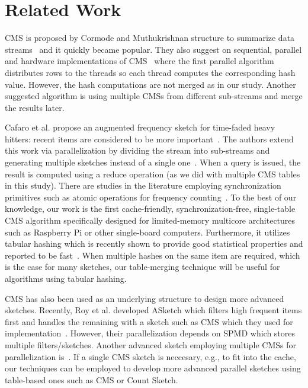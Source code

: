 \documentclass[10pt, conference, compsocconf]{IEEEtran}
\begin{document}
\section{Related Work}\label{sec:related}

CMS is proposed by Cormode and Muthukrishnan structure to summarize data streams~\cite{cormode2005} and it quickly became popular. They also suggest on sequential, parallel and hardware implementations of CMS~\cite{cormode2012} where the first parallel algorithm distributes rows to the threads so each thread computes the corresponding hash value. However, the hash computations are not merged as in our study. Another suggested algorithm is using multiple CMSs from different sub-streams and merge the results later.

Cafaro et al. propose an augmented frequency sketch for time-faded heavy hitters: recent items are considered to be more important~\cite{cafaro2016}. The authors extend this work via parallelization by dividing the stream into sub-streams and generating multiple sketches instead of a single one~\cite{cafaro2018}. When a query is issued, the result is computed using a reduce operation (as we did with multiple CMS tables in this study). There are studies in the literature employing synchronization primitives such as atomic operations for frequency counting~\cite{Das2009}. To the best of our knowledge, our work is the first cache-friendly, synchronization-free, single-table CMS algorithm specifically designed for limited-memory multicore architectures such as Raspberry Pi or other single-board computers. Furthermore, it utilizes tabular hashing which is recently shown to provide good statistical properties and reported to be fast~\cite{thorup2017,Dahlgaard2017}. When multiple hashes on the same item are required, which is the case for many sketches, our table-merging technique will be useful for algorithms using tabular hashing.

CMS has also been used as an underlying structure to design more advanced sketches. Recently, Roy et al. developed ASketch which filters high frequent items first and handles the remaining with a sketch such as CMS which they used for implementation~\cite{roy2016}. However, their parallelization depends on SPMD which stores multiple filters/sketches. Another advanced sketch employing multiple CMSs for parallelization is~\cite{Thomas2007}. If a single CMS sketch is neccesary, e.g., to fit into the cache, our techniques can be employed to develop more advanced parallel sketches using table-based ones such as CMS or Count Sketch.
\end{document}
